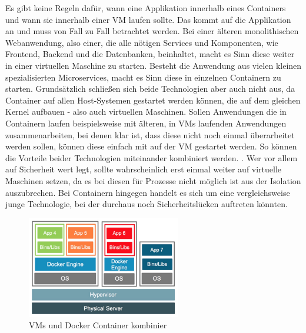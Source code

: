 \noindent Es gibt keine Regeln dafür, wann eine Applikation innerhalb eines Containers und wann sie innerhalb einer VM laufen sollte. Das kommt auf die Applikation an und muss von Fall zu Fall betrachtet werden. Bei einer älteren monolithischen Webanwendung, also einer, die alle nötigen Services und Komponenten, wie Frontend, Backend und die Datenbanken, beinhaltet, macht es Sinn diese weiter in einer virtuellen Maschine zu starten. Besteht die Anwendung aus vielen kleinen spezialisierten Microservices, macht es Sinn diese in einzelnen Containern zu starten. Grundsätzlich schließen sich beide Technologien aber auch nicht aus, da Container auf allen Host-Systemen gestartet werden können, die auf dem gleichen Kernel aufbauen - also auch virtuellen Maschinen. Sollen Anwendungen die in Containern laufen beispielsweise mit älteren, in VMs laufenden Anwendungen zusammenarbeiten, bei denen klar ist, dass diese nicht noch einmal überarbeitet werden sollen, können diese einfach mit auf der VM gestartet werden. So können die Vorteile beider Technologien miteinander kombiniert werden. \cite{docker:cavm}. Wer vor allem auf Sicherheit wert legt, sollte wahrscheinlich erst einmal weiter auf virtuelle Maschinen setzen, da es bei diesen für Prozesse nicht möglich ist aus der Isolation auszubrechen. Bei Containern hingegen handelt es sich um eine vergleichsweise junge Technologie, bei der durchaus noch Sicherheitslücken auftreten könnten.\\

\begin{figure}[!ht]
  \centering
  \includegraphics[width=0.6\textwidth]{images/7-container-vm-combined.jpg}
  \caption{VMs und Docker Container kombinier \cite{docker:cavm}}
\end{figure}
